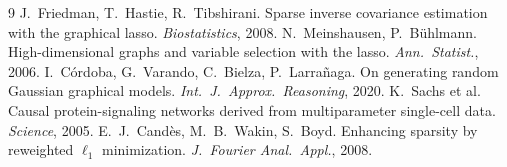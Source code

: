 \documentclass[10pt]{article}
\begin{document}
\begin{thebibliography}{9}
 J.~Friedman, T.~Hastie, R.~Tibshirani. Sparse inverse covariance estimation with the graphical lasso. \emph{Biostatistics}, 2008.
 N.~Meinshausen, P.~B\"uhlmann. High-dimensional graphs and variable selection with the lasso. \emph{Ann.\ Statist.}, 2006.
 I.~C\'ordoba, G.~Varando, C.~Bielza, P.~Larra\~naga. On generating random Gaussian graphical models. \emph{Int.\ J.\ Approx.\ Reasoning}, 2020.
 K.~Sachs et al. Causal protein-signaling networks derived from multiparameter single-cell data. \emph{Science}, 2005.
 E.~J.~Cand\`es, M.~B.~Wakin, S.~Boyd. Enhancing sparsity by reweighted $\ell_1$ minimization. \emph{J.\ Fourier Anal.\ Appl.}, 2008.
\end{thebibliography}
\end{document}
